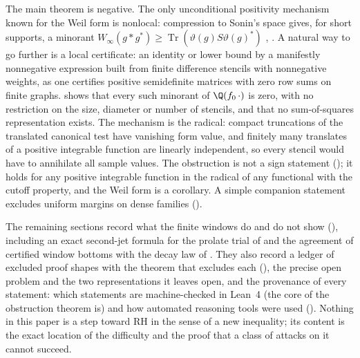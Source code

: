 The main theorem is negative. The only unconditional positivity mechanism known for the Weil form is nonlocal: compression to
Sonin's space gives, for short supports, a minorant $W_\infty(g*g^*)\ge\operatorname{Tr}(\vartheta(g)S\vartheta(g)^*)$
\cite[Thm.~7.1]{Connes2026}, \cite{CC-WEILPOS-2020}. A natural way to go further is a local certificate: an identity or lower bound by a
manifestly nonnegative expression built from finite difference stencils with nonnegative weights, as one certifies positive
semidefinite matrices with zero row sums on finite graphs.  shows that every such minorant of $\Q(f_0\,\cdot)$
is zero, with no restriction on the size, diameter or number of stencils, and  that no sum-of-squares representation
exists. The mechanism is the radical: compact truncations of the translated canonical test have vanishing form value, and finitely many
translates of a positive integrable function are linearly independent, so every stencil would have to annihilate all sample values.
The obstruction is not a sign statement (); it holds for any positive integrable function in the radical of any functional
with the cutoff property, and the Weil form is a corollary. A simple companion statement excludes uniform margins on dense families ().

The remaining sections record what the finite windows do and do not show (), including an exact second-jet formula
for the prolate trial of \cite{CCM-ZST-2025} and the agreement of certified window bottoms with the decay law of \cite{XUEFENGZHU-2026}.
They also record a ledger of excluded proof shapes with the theorem that excludes each (), the precise open
problem and the two representations it leaves open, and the provenance of every statement: which statements are machine-checked
in Lean~4 (the core of the obstruction theorem is) and how automated reasoning tools were used (). Nothing in this paper is a step toward RH in the sense of a new
inequality; its content is the exact location of the difficulty and the proof that a class of attacks on it cannot succeed.

